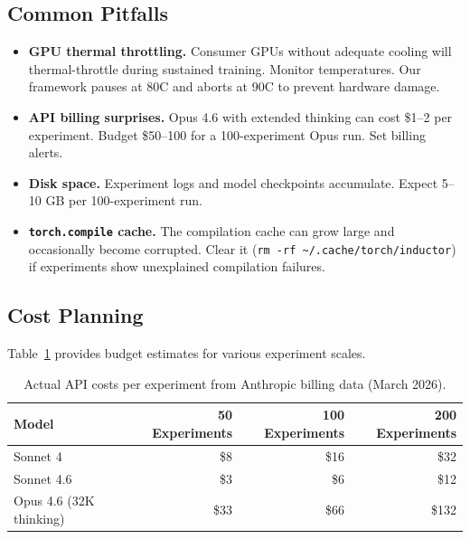 \documentclass[11pt]{article}
\begin{document}
\subsection{Common Pitfalls}
\label{sec:pitfalls}

\begin{itemize}[leftmargin=*]
    \item \textbf{GPU thermal throttling.} Consumer GPUs without adequate cooling will thermal-throttle during sustained training. Monitor temperatures. Our framework pauses at 80\textdegree C and aborts at 90\textdegree C to prevent hardware damage.
    \item \textbf{API billing surprises.} Opus 4.6 with extended thinking can cost \$1--2 per experiment. Budget \$50--100 for a 100-experiment Opus run. Set billing alerts.
    \item \textbf{Disk space.} Experiment logs and model checkpoints accumulate. Expect 5--10 GB per 100-experiment run.
    \item \textbf{\texttt{torch.compile} cache.} The compilation cache can grow large and occasionally become corrupted. Clear it (\texttt{rm -rf \~{}/.cache/torch/inductor}) if experiments show unexplained compilation failures.
\end{itemize}

\subsection{Cost Planning}
\label{sec:cost_planning}

Table~\ref{tab:budget} provides budget estimates for various experiment scales.

\begin{table}[H]
\centering
\caption{Actual API costs per experiment from Anthropic billing data (March 2026).}
\label{tab:budget}
\begin{tabular}{lrrr}
\toprule
\textbf{Model} & \textbf{50 Experiments} & \textbf{100 Experiments} & \textbf{200 Experiments} \\
\midrule
Sonnet 4       & \$8   & \$16  & \$32  \\
Sonnet 4.6     & \$3   & \$6   & \$12  \\
Opus 4.6 (32K thinking) & \$33 & \$66  & \$132 \\
\bottomrule
\end{tabular}
\end{table}
\end{document}

